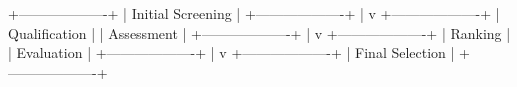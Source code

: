 +-------------------+
| Initial Screening |
+-------------------+
        |
        v
+-------------------+
| Qualification    |
| Assessment       |
+-------------------+
        |
        v
+-------------------+
| Ranking           |
| Evaluation        |
+-------------------+
        |
        v
+-------------------+
| Final Selection   |
+-------------------+